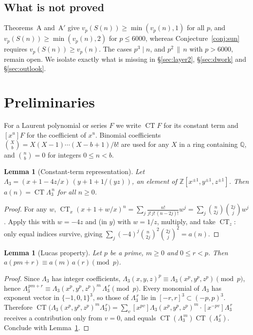 \documentclass[11pt]{amsart}
\newtheorem{lemma}[theorem]{Lemma}
\theoremstyle{definition}
\newcommand{\Z}{\mathbb{Z}}
\newcommand{\Q}{\mathbb{Q}}
\newcommand{\CT}{\operatorname{CT}}
\begin{document}
\subsection*{What is not proved}
Theorems~A and~A$'$ give $v_p(S(n))\ge\min(v_p(n),1)$ for all $p$, and $v_p(S(n))\ge
\min(v_p(n),2)$ for $p\le6000$, whereas Conjecture~\ref{conj:sun} requires $v_p(S(n))\ge v_p(n)$.
The cases $p^3\mid n$, and $p^2\,\|\,n$ with $p>6000$, remain open. We isolate exactly what is
missing in \S\ref{sec:layer2}, \S\ref{sec:dwork} and \S\ref{sec:outlook}.

\section{Preliminaries}

For a Laurent polynomial or series $F$ we write $\CT F$ for its constant term and $[x^u]F$ for the
coefficient of $x^u$. Binomial coefficients $\binom Xb=X(X-1)\cdots(X-b+1)/b!$ are used for any
$X$ in a ring containing $\Q$, and $\binom nb=0$ for integers $0\le n<b$.

\begin{lemma}[Constant-term representation]\label{lem:ct}
Let $\Lambda_3=(x+1-4z/x)\,(y+1+1/(yz))$, an element of $\Z[x^{\pm1},y^{\pm1},z^{\pm1}]$. Then
$a(n)=\CT\Lambda_3^{\,n}$ for all $n\ge0$.
\end{lemma}

\begin{proof}
For any $w$, $\CT_x(x+1+w/x)^n=\sum_j\frac{n!}{j!\,j!\,(n-2j)!}w^j=\sum_j\binom n{2j}\binom{2j}j w^j$.
Apply this with $w=-4z$ and (in $y$) with $w=1/z$, multiply, and take $\CT_z$: only equal indices
survive, giving $\sum_j(-4)^j\binom n{2j}^2\binom{2j}j^2=a(n)$.
\end{proof}

\begin{lemma}[Lucas property]\label{lem:lucas}
Let $p$ be a prime, $m\ge0$ and $0\le r<p$. Then $a(pm+r)\equiv a(m)\,a(r)\pmod p$.
\end{lemma}

\begin{proof}
Since $\Lambda_3$ has integer coefficients, $\Lambda_3(x,y,z)^p\equiv\Lambda_3(x^p,y^p,z^p)\pmod p$,
hence $\Lambda_3^{\,pm+r}\equiv\Lambda_3(x^p,y^p,z^p)^m\,\Lambda_3^{\,r}\pmod p$. Every monomial of
$\Lambda_3$ has exponent vector in $\{-1,0,1\}^3$, so those of $\Lambda_3^{\,r}$ lie in
$[-r,r]^3\subset(-p,p)^3$. Therefore
$\CT\big(\Lambda_3(x^p,y^p,z^p)^m\Lambda_3^{\,r}\big)
=\sum_{v}[x^{pv}]\Lambda_3(x^p,y^p,z^p)^m\cdot[x^{-pv}]\Lambda_3^{\,r}$ receives a contribution only
from $v=0$, and equals $\CT(\Lambda_3^{\,m})\CT(\Lambda_3^{\,r})$. Conclude with
Lemma~\ref{lem:ct}.
\end{proof}
\end{document}

